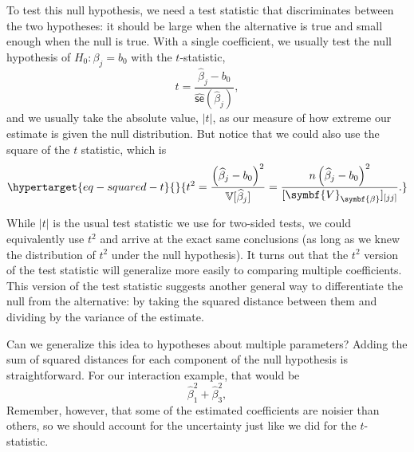 \documentclass[
  letterpaper,
  DIV=11,
  numbers=noendperiod]{scrreprt}
\newcommand{\mb}{\symbf}
\newcommand{\V}{\mathbb{V}}
\newcommand{\se}{\textsf{se}}
\newcommand{\bfbeta}{\mb{\beta}}
\theoremstyle{plain}
\theoremstyle{definition}
\theoremstyle{definition}
\theoremstyle{remark}
\begin{document}
To test this null hypothesis, we need a test statistic that
discriminates between the two hypotheses: it should be large when the
alternative is true and small enough when the null is true. With a
single coefficient, we usually test the null hypothesis of
\(H_0: \beta_j = b_0\) with the \(t\)-statistic, \[ 
t = \frac{\widehat{\beta}_{j} - b_{0}}{\widehat{\se}(\widehat{\beta}_{j})},
\] and we usually take the absolute value, \(|t|\), as our measure of
how extreme our estimate is given the null distribution. But notice that
we could also use the square of the \(t\) statistic, which is
\begin{equation}\protect\hypertarget{eq-squared-t}{}{ 
t^{2} = \frac{\left(\widehat{\beta}_{j} - b_{0}\right)^{2}}{\V[\widehat{\beta}_{j}]} = \frac{n\left(\widehat{\beta}_{j} - b_{0}\right)^{2}}{[\mb{V}_{\bfbeta}]_{[jj]}}. 
}\label{eq-squared-t}\end{equation}

While \(|t|\) is the usual test statistic we use for two-sided tests, we
could equivalently use \(t^2\) and arrive at the exact same conclusions
(as long as we knew the distribution of \(t^2\) under the null
hypothesis). It turns out that the \(t^2\) version of the test statistic
will generalize more easily to comparing multiple coefficients. This
version of the test statistic suggests another general way to
differentiate the null from the alternative: by taking the squared
distance between them and dividing by the variance of the estimate.

Can we generalize this idea to hypotheses about multiple parameters?
Adding the sum of squared distances for each component of the null
hypothesis is straightforward. For our interaction example, that would
be \[ 
\widehat{\beta}_1^2 + \widehat{\beta}_3^2, 
\] Remember, however, that some of the estimated coefficients are
noisier than others, so we should account for the uncertainty just like
we did for the \(t\)-statistic.
\end{document}
